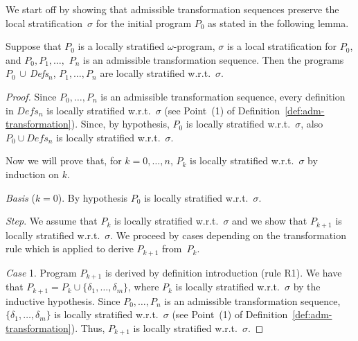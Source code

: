 \documentclass[english]{tlp}
\renewcommand{\mathit}{\displaystyle}
\begin{document}
We start off by showing that admissible transformation sequences
preserve the local stratification~\( \sigma \) for the initial
program \( P_{0} \) as stated in the following lemma.

\medskip


\noindent Suppose that $P_{0}$ is a locally stratified
$\omega$-program, $\sigma$ is a local stratification for $P_0$, and
$P_{0},P_{1},\ldots ,$ $P_{n}$ is an admissible transformation sequence. Then
the programs $P_{0}\,\cup\,${\it{Defs}}$_{n}$, $P_{1},\ldots ,P_{n}$
are locally stratified
w.r.t.~$\sigma$.

\begin{proof}
Since $P_{0},\ldots ,P_{n}$ is an admissible transformation
sequence, every definition in $\mathit{Defs}_{n}$ 
is locally stratified w.r.t.~$\sigma$ (see Point~(1) of
Definition~\ref{def:adm-transformation}). Since, by hypothesis, $P_0$
is locally stratified w.r.t.~$\sigma$, also $P_{0}\cup
\mathit{Defs}_{n}$ is locally stratified w.r.t.~$\sigma$.

\noindent Now we will prove that, for \( k=0,\ldots ,n \), \( P_{k}
\) is locally stratified w.r.t.~\( \sigma  \) by induction on \( k
\).

\medskip

\noindent \emph{Basis} (\( k=0 \)). By hypothesis \( P_{0} \) is
locally stratified w.r.t.~\( \sigma  \).

\medskip

\noindent \emph{Step}. We assume that \( P_{k} \) is
locally stratified w.r.t.~\( \sigma  \) and we show that \( P_{k+1}
\) is locally stratified w.r.t.~\( \sigma  \). We proceed by cases
depending on the transformation rule which is applied to derive \(
P_{k+1} \) from~\( P_{k} \).

\medskip

\noindent \emph{Case} 1. Program \( P_{k+1} \) is derived by
definition introduction (rule R1). We have that \( P_{k+1}=P_{k}\cup
\{\delta _{1},\ldots ,\delta _{m}\} \), where \( P_{k} \) is locally
stratified w.r.t.~\( \sigma  \) by the inductive hypothesis. Since
$P_{0},\ldots ,P_{n}$ is an admissible transformation sequence, 
\(\{\delta _{1},\ldots ,\delta _{m}\} \) 
is locally stratified w.r.t.~$\sigma$
(see Point~(1) of Definition~\ref{def:adm-transformation}). Thus, \( P_{k+1} \) is locally
stratified w.r.t.~\( \sigma  \).

\medskip


\end{proof}
\end{document}

